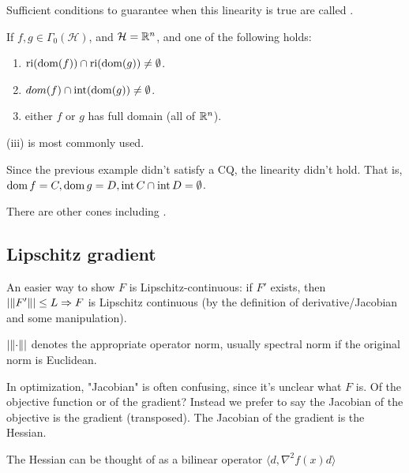 \documentclass[class=article,crop=false]{standalone}
\begin{document}
\begin{remark}
	Sufficient conditions to guarantee when this linearity is true are called .
\end{remark}
\begin{coro}[16.48 (iv) BC17]
	If $ f,g \in \Gamma_0(\mathcal{H})$, and $\mathcal{H} = \mathbb{R}^{n} $, and one of the following holds:
	\begin{enumerate}[label=(\roman*)]
		\item $ \operatorname{ri}(\operatorname{dom}(f)) \cap \operatorname{ri}(\operatorname{dom}(g)) \neq \emptyset $.
		\item $ \\dom(f) \cap \operatorname{int} (\operatorname{dom}(g)) \neq \emptyset$.
		\item either $ f$ or  $ g$ has full domain (all of $ \mathbb{R}^{n}$).
	\end{enumerate}
\end{coro}
\begin{note}
	(iii) is most commonly used.
\end{note}
Since the previous example didn't satisfy a CQ, the linearity didn't hold. That is, $ \operatorname{dom} f = C, \operatorname{dom} g =D, \operatorname{int} C \cap \operatorname{int} D = \emptyset$.
\begin{remark}
There are other cones including . 
\end{remark}
\newpage
\subsection{Lipschitz gradient}
An easier way to show $ F$ is Lipschitz-continuous: if $ F'$ exists, then  $ |{\left\lVert{ F'}\right\rVert}| \leq L \Rightarrow F$ is Lipschitz continuous (by the definition of derivative/Jacobian and some manipulation).
\begin{notation}
	$ |{\left\lVert{ \cdot }\right\rVert} |$ denotes the appropriate operator norm, usually spectral norm if the original norm is Euclidean.
\end{notation}

\begin{remark}
	In optimization, "Jacobian" is often confusing, since it's unclear what $ F$ is. Of the objective function or of the gradient? Instead we prefer to say the Jacobian of the objective is the gradient (transposed). The Jacobian of the gradient is the Hessian.
\end{remark}
\begin{remark}
	The Hessian can be thought of as a bilinear operator $ \langle d, \nabla ^2 f(x) d \rangle$
\end{remark}
\end{document}
